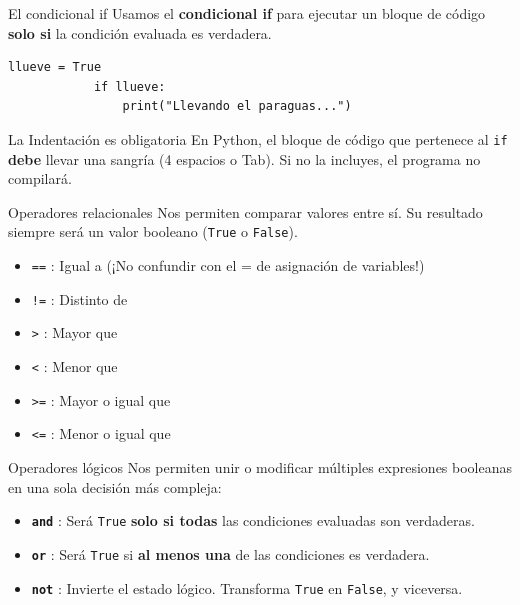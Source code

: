 \documentclass[aspectratio=169, 11pt]{beamer}
\begin{document}
	\begin{frame}[fragile]{El condicional if}
		Usamos el \textbf{condicional if} para ejecutar un bloque de código \textbf{solo si} la condición evaluada es verdadera.
		
		\begin{lstlisting}[gobble=4]
			llueve = True
			if llueve:
				print("Llevando el paraguas...")
		\end{lstlisting}
		
		\begin{alertblock}{La Indentación es obligatoria}
			\vspace{0.01cm}
			En Python, el bloque de código que pertenece al \texttt{if} \textbf{debe} llevar una sangría (4 espacios o Tab). Si no la incluyes, el programa no compilará.
		\end{alertblock}
	\end{frame}
	
	\begin{frame}{Operadores relacionales}
		Nos permiten comparar valores entre sí. Su resultado siempre será un valor booleano (\texttt{True} o \texttt{False}).
		
		\vspace{0.3cm}
		\begin{itemize}
			\item \texttt{==} : Igual a \alert{(¡No confundir con el = de asignación de variables!)}
			\item \texttt{!=} : Distinto de
			\item \texttt{>} : Mayor que
			\item \texttt{<} : Menor que
			\item \texttt{>=} : Mayor o igual que
			\item \texttt{<=} : Menor o igual que
		\end{itemize}
	\end{frame}
	
	\begin{frame}{Operadores lógicos}
		Nos permiten unir o modificar múltiples expresiones booleanas en una sola decisión más compleja:
		
		\vspace{0.3cm}
		\begin{itemize}
			\item \textbf{\texttt{and}} : Será \texttt{True} \textbf{solo si todas} las condiciones evaluadas son verdaderas.
			\item \textbf{\texttt{or}} : Será \texttt{True} si \textbf{al menos una} de las condiciones es verdadera.
			\item \textbf{\texttt{not}} : Invierte el estado lógico. Transforma \texttt{True} en \texttt{False}, y viceversa.
		\end{itemize}
	\end{frame}
	
\end{document}
